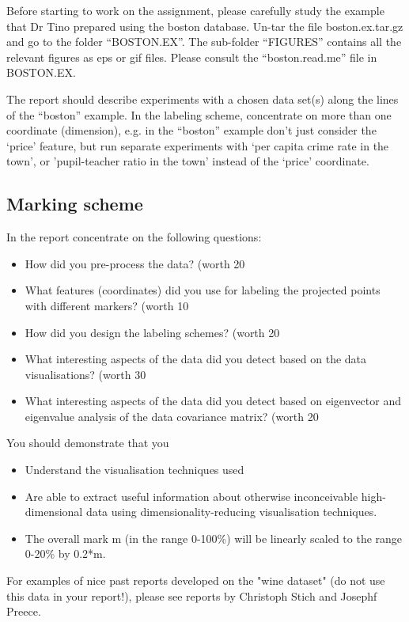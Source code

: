 \documentclass[preprint,12pt]{elsarticle}
\begin{document}
Before starting to work on the assignment, please carefully study the example that Dr Tino prepared using the boston database. Un-tar the file boston.ex.tar.gz and go to the folder ``BOSTON.EX''.   The sub-folder ``FIGURES'' contains all the relevant figures as eps or gif files. Please consult the ``boston.read.me'' file in BOSTON.EX.

The report should describe experiments with a chosen data set(s) along the lines of the ``boston'' example.  In the labeling scheme, concentrate on more than one coordinate (dimension), e.g. in the ``boston'' example don't just consider the `price' feature, but run separate experiments with `per capita crime rate in the town', or 'pupil-teacher ratio in the town' instead of the `price' coordinate.
\subsection{Marking scheme}
\label{ss:marking}
In the report concentrate on the following questions:
\begin{itemize}
    \item How did you pre-process the data? (worth 20%
    \item What features (coordinates) did you use for labeling the projected points with different markers? (worth 10%
    \item How did you design the labeling schemes? (worth 20%
    \item What interesting aspects of the data did you detect based on the data visualisations? (worth 30%
    \item What interesting aspects of the data did you detect based on eigenvector and eigenvalue analysis of the data covariance matrix? (worth 20%
\end{itemize}
You should demonstrate that you
\begin{itemize}
    \item Understand the visualisation techniques used
    \item Are able to extract useful information about otherwise inconceivable high-dimensional data using dimensionality-reducing visualisation techniques.
    \item The overall mark m (in the range 0-100\%) will be linearly scaled to the range 0-20\% by 0.2*m.
\end{itemize}
For examples of nice past reports developed on the "wine dataset" (do not use this data in your report!), please see reports by Christoph Stich and Josephf Preece.
\end{document}
